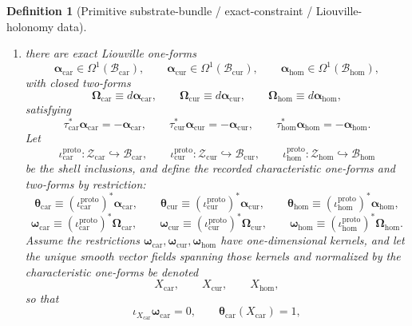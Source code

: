 \documentclass[11pt]{article}
\newcommand{\TensorFlowField}{X_{\mathrm{car}}}
\newcommand{\CurFlowField}{X_{\mathrm{cur}}}
\newcommand{\HomFlowField}{X_{\mathrm{hom}}}
\newcommand{\TensorProtoSpace}{\mathcal Z_{\mathrm{car}}}
\newcommand{\CurProtoSpace}{\mathcal Z_{\mathrm{cur}}}
\newcommand{\HomProtoSpace}{\mathcal Z_{\mathrm{hom}}}
\newcommand{\TensorCharForm}{\boldsymbol{\theta}_{\mathrm{car}}}
\newcommand{\CurCharForm}{\boldsymbol{\theta}_{\mathrm{cur}}}
\newcommand{\HomCharForm}{\boldsymbol{\theta}_{\mathrm{hom}}}
\newcommand{\TensorCharTwo}{\boldsymbol{\omega}_{\mathrm{car}}}
\newcommand{\CurCharTwo}{\boldsymbol{\omega}_{\mathrm{cur}}}
\newcommand{\HomCharTwo}{\boldsymbol{\omega}_{\mathrm{hom}}}
\newcommand{\TensorSeedSpace}{\mathcal B_{\mathrm{car}}}
\newcommand{\CurSeedSpace}{\mathcal B_{\mathrm{cur}}}
\newcommand{\HomSeedSpace}{\mathcal B_{\mathrm{hom}}}
\newcommand{\TensorSeedTimeRev}{\tau_{\mathrm{car}}}
\newcommand{\CurSeedTimeRev}{\tau_{\mathrm{cur}}}
\newcommand{\HomSeedTimeRev}{\tau_{\mathrm{hom}}}
\newcommand{\TensorSeedLiouville}{\boldsymbol{\alpha}_{\mathrm{car}}}
\newcommand{\CurSeedLiouville}{\boldsymbol{\alpha}_{\mathrm{cur}}}
\newcommand{\HomSeedLiouville}{\boldsymbol{\alpha}_{\mathrm{hom}}}
\newcommand{\TensorSeedSymplectic}{\boldsymbol{\Omega}_{\mathrm{car}}}
\newcommand{\CurSeedSymplectic}{\boldsymbol{\Omega}_{\mathrm{cur}}}
\newcommand{\HomSeedSymplectic}{\boldsymbol{\Omega}_{\mathrm{hom}}}
\newcommand{\TensorProtoInc}{\iota_{\mathrm{car}}^{\mathrm{proto}}}
\newcommand{\CurProtoInc}{\iota_{\mathrm{cur}}^{\mathrm{proto}}}
\newcommand{\HomProtoInc}{\iota_{\mathrm{hom}}^{\mathrm{proto}}}
\newtheorem{definition}{Definition}
\begin{document}
\begin{definition}[Primitive substrate-bundle / exact-constraint / Liouville-holonomy data]
\begin{enumerate}
\begin{equation}
    \label{eq:constraint_gap_hom}
    \end{equation}
    for all vectors \(\xi,\eta,\zeta\) orthogonal, with respect to the corresponding seed metrics, to the tangent spaces of the corresponding constraint shells.
    \item there are exact Liouville one-forms
    \[
    \TensorSeedLiouville\in\Omega^1(\TensorSeedSpace),\qquad
    \CurSeedLiouville\in\Omega^1(\CurSeedSpace),\qquad
    \HomSeedLiouville\in\Omega^1(\HomSeedSpace),
    \]
    with closed two-forms
    \[
    \TensorSeedSymplectic\equiv d\TensorSeedLiouville,\qquad
    \CurSeedSymplectic\equiv d\CurSeedLiouville,\qquad
    \HomSeedSymplectic\equiv d\HomSeedLiouville,
    \]
    satisfying
    \[
    \TensorSeedTimeRev^*\TensorSeedLiouville=-\TensorSeedLiouville,\qquad
    \CurSeedTimeRev^*\CurSeedLiouville=-\CurSeedLiouville,\qquad
    \HomSeedTimeRev^*\HomSeedLiouville=-\HomSeedLiouville.
    \]
    Let
    \begin{equation}
    \TensorProtoInc:\TensorProtoSpace\hookrightarrow\TensorSeedSpace,\qquad
    \CurProtoInc:\CurProtoSpace\hookrightarrow\CurSeedSpace,\qquad
    \HomProtoInc:\HomProtoSpace\hookrightarrow\HomSeedSpace
    \label{eq:proto_inclusions}
    \end{equation}
    be the shell inclusions, and define the recorded characteristic one-forms and two-forms by restriction:
    \begin{equation}
    \TensorCharForm\equiv (\TensorProtoInc)^*\TensorSeedLiouville,\qquad
    \CurCharForm\equiv (\CurProtoInc)^*\CurSeedLiouville,\qquad
    \HomCharForm\equiv (\HomProtoInc)^*\HomSeedLiouville,
    \label{eq:char_form_from_seed}
    \end{equation}
    \begin{equation}
    \TensorCharTwo\equiv (\TensorProtoInc)^*\TensorSeedSymplectic,\qquad
    \CurCharTwo\equiv (\CurProtoInc)^*\CurSeedSymplectic,\qquad
    \HomCharTwo\equiv (\HomProtoInc)^*\HomSeedSymplectic.
    \label{eq:char_two_from_seed}
    \end{equation}
    Assume the restrictions \(\TensorCharTwo,\CurCharTwo,\HomCharTwo\) have one-dimensional kernels, and let the unique smooth vector fields spanning those kernels and normalized by the characteristic one-forms be denoted
    \[
    \TensorFlowField,\qquad
    \CurFlowField,\qquad
    \HomFlowField,
    \]
    so that
    \begin{equation}
    \iota_{\TensorFlowField}\TensorCharTwo=0,
    \qquad
    \TensorCharForm(\TensorFlowField)=1,

\end{equation}
\end{enumerate}
\end{definition}
\end{document}
